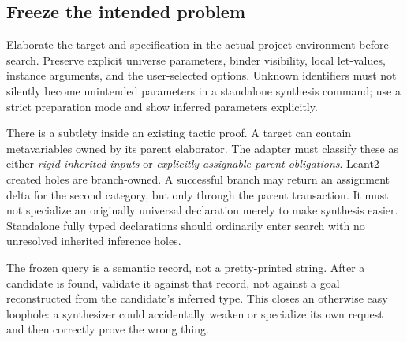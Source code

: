 \subsection{Freeze the intended problem}
Elaborate the target and specification in the actual project environment before search. Preserve explicit universe parameters, binder visibility, local let-values, instance arguments, and the user-selected options. Unknown identifiers must not silently become unintended parameters in a standalone synthesis command; use a strict preparation mode and show inferred parameters explicitly.

There is a subtlety inside an existing tactic proof. A target can contain metavariables owned by its parent elaborator. The adapter must classify these as either \emph{rigid inherited inputs} or \emph{explicitly assignable parent obligations}. Leant2-created holes are branch-owned. A successful branch may return an assignment delta for the second category, but only through the parent transaction. It must not specialize an originally universal declaration merely to make synthesis easier. Standalone fully typed declarations should ordinarily enter search with no unresolved inherited inference holes.

The frozen query is a semantic record, not a pretty-printed string. After a candidate is found, validate it against that record, not against a goal reconstructed from the candidate's inferred type. This closes an otherwise easy loophole: a synthesizer could accidentally weaken or specialize its own request and then correctly prove the wrong thing.

